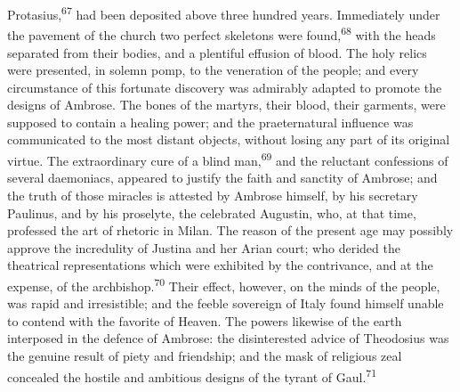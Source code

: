 Protasius,\textsuperscript{67} had been deposited above three hundred years.
Immediately under the pavement of the church two perfect
skeletons were found,\textsuperscript{68} with the heads separated from their
bodies, and a plentiful effusion of blood. The holy relics were
presented, in solemn pomp, to the veneration of the people; and
every circumstance of this fortunate discovery was admirably
adapted to promote the designs of Ambrose. The bones of the
martyrs, their blood, their garments, were supposed to contain a
healing power; and the praeternatural influence was communicated
to the most distant objects, without losing any part of its
original virtue. The extraordinary cure of a blind man,\textsuperscript{69} and
the reluctant confessions of several daemoniacs, appeared to
justify the faith and sanctity of Ambrose; and the truth of those
miracles is attested by Ambrose himself, by his secretary
Paulinus, and by his proselyte, the celebrated Augustin, who, at
that time, professed the art of rhetoric in Milan. The reason of
the present age may possibly approve the incredulity of Justina
and her Arian court; who derided the theatrical representations
which were exhibited by the contrivance, and at the expense, of
the archbishop.\textsuperscript{70} Their effect, however, on the minds of the
people, was rapid and irresistible; and the feeble sovereign of
Italy found himself unable to contend with the favorite of
Heaven. The powers likewise of the earth interposed in the
defence of Ambrose: the disinterested advice of Theodosius was
the genuine result of piety and friendship; and the mask of
religious zeal concealed the hostile and ambitious designs of the
tyrant of Gaul.\textsuperscript{71}





